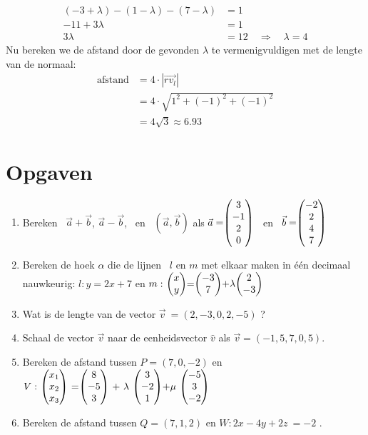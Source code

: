 \begin{align*}
    (-3 + \lambda) - (1-\lambda) - (7-\lambda) &= 1 \\
    -11 + 3\lambda &= 1 \\
    3\lambda &= 12 \quad \Rightarrow \quad \lambda = 4
\end{align*}
Nu bereken we de afstand door de gevonden $\lambda$ te vermenigvuldigen met de lengte van de normaal: 
\begin{align*}
    \text{afstand} &= 4\cdot |\overrightarrow{rv_{l}}| \\
    &= 4\cdot \sqrt{1^{2} + (-1)^{2} + (-1)^{2} } \\
    &= 4\sqrt{3} \approx 6.93
\end{align*}

\newpage
\section{Opgaven}
\begin{enumerate}
	\item  Bereken \ $ \vec{a} + \vec{b} $, \quad $ \vec{a} - \vec{b} $, \ en \ $  (\vec{a} , \vec{b}) $  als $ \vec{a} = \vecvier{3}{-1}{2}{0}  $ \  en \  $  \vec{b} =  \vecvier{-2}{2}{4}{7} $
	
	\item  Bereken de hoek $\alpha$ die de  lijnen \ $  l $ en $ m $ met elkaar maken in één decimaal nauwkeurig:
	$ l:  y = 2x +7  $ en $ m: \  \vectwee{x}{y} = \vectwee{-3}{7} + \lambda \vectwee{2}{-3}  $
	
	\item Wat is de lengte van de vector $  \vec{v} \ = (2, -3, 0, 2, -5) $ ?
	
	\item Schaal de vector $  \vec{v} $ naar de eenheidsvector $\hat{v}$
	als $  \vec{v} = (-1, 5, 7, 0, 5) $.
	
	\item Bereken de afstand tussen  $  P = (7,0,-2)  $ en 
	$ V: \ \vecdriesnel{x} \
	=  \vecdrie {8} {-5} {3}  \
	+  \ \lambda \ \vecdrie{3}{-2}{1} 
	+ \mu \  \vecdrie{-5}{3}{-2} $ 
	
	\item   Bereken de afstand tussen  $  Q = (7,1,2)  $ en 
	$ W:2x - 4y +2z \ = -2 $ . \\ \\ 
	
\end{enumerate}

